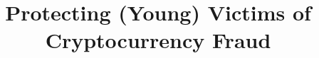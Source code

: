 \documentclass[11pt,runningheads]{llncs}
\date{}
\newcommand{\1}{1}
\newcommand{\2}{2}
\newcommand{\3}{3}
\newcommand{\4}{4}
\begin{document}
%
\newcommand{\printcntr}{%
  \stepcounter{mycounter}%
  \padzeroes[1]{\decimal{mycounter}}%
}

%
\title{Protecting (Young) Victims of Cryptocurrency Fraud}
\author{}
\institute{}
\maketitle  
\vspace{-21mm}
\begin{multicols}{2}







%







%
%
\appendix
\end{multicols}
\end{document}

